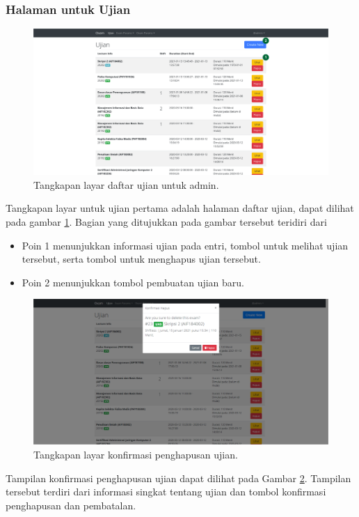     \subsubsection{Halaman untuk Ujian}
    \begin{figure}
        \centering
        \includegraphics[width=0.7\paperwidth]{Gambar/implemented-interface/admin/ujian-list.png}
        \caption{Tangkapan layar daftar ujian untuk admin.}
        \label{fig:screenshot-admin-exam-list}
    \end{figure}
    Tangkapan layar untuk ujian pertama adalah halaman daftar ujian, dapat dilihat pada gambar
    \ref{fig:screenshot-admin-exam-list}. Bagian yang ditujukkan pada gambar tersebut teridiri dari
    \begin{itemize}
        \item Poin 1 menunjukkan informasi ujian pada entri, tombol untuk melihat ujian tersebut, serta
            tombol untuk menghapus ujian tersebut.
        \item Poin 2 menunjukkan tombol pembuatan ujian baru.
    \end{itemize}
    
    \begin{figure}
        \centering
        \includegraphics[width=0.7\paperwidth]{Gambar/implemented-interface/admin/ujian-delete.png}
        \caption{Tangkapan layar konfirmasi penghapusan ujian.}
        \label{fig:screenshot-admin-exam-delete}
    \end{figure}
    Tampilan konfirmasi penghapusan ujian dapat dilihat pada Gambar \ref{fig:screenshot-admin-exam-delete}.
    Tampilan tersebut terdiri dari informasi singkat tentang ujian dan tombol konfirmasi penghapusan
    dan pembatalan.
    
